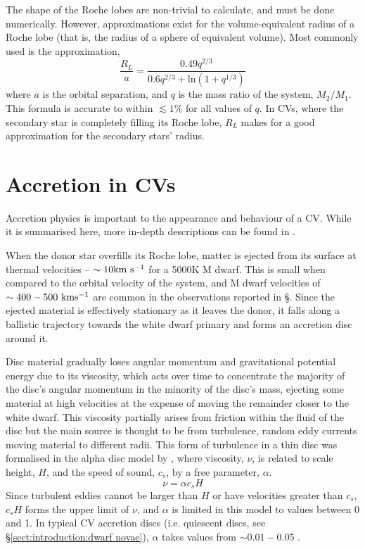 The shape of the Roche lobes are non-trivial to calculate, and must be done numerically. However, approximations exist for the volume-equivalent radius of a Roche lobe (that is, the radius of a sphere of equivalent volume). Most commonly used is the \citet{Eggleton1983} approximation,
\begin{equation}
    \label{eqn:eggleton approximation}
    \frac{R_L}{a} = \frac{0.49 q^{2/3}}{0.6 q^{2/3} + \mathrm{ln}(1 + q^{1/3})}
\end{equation}
where $a$ is the orbital separation, and $q$ is the mass ratio of the system, $M_2 / M_1$. This formula is accurate to within $\lesssim 1\%$ for all values of $q$. In CVs, where the secondary star is completely filling its Roche lobe, $R_L$ makes for a good approximation for the secondary stars' radius.


\section{Accretion in CVs}
\label{sect:introduction:accretion}
Accretion physics is important to the appearance and behaviour of a CV. While it is summarised here, more in-depth descriptions can be found in \citet{warner1995, hellier2001, ritter2010}.

When the donor star overfills its Roche lobe, matter is ejected from its surface at thermal velocities -- $\sim 10 \rm km\ s^{-1}$ for a 5000K M dwarf. This is small when compared to the orbital velocity of the system, and M dwarf velocities of $\sim 400-500 \rm\ km s^{-1}$ are common in the observations reported in \S{}. Since the ejected material is effectively stationary as it leaves the donor, it falls along a ballistic trajectory towards the white dwarf primary and forms an accretion disc around it. 

Disc material gradually loses angular momentum and gravitational potential energy due to its viscosity, which acts over time to concentrate the majority of the disc's angular momentum in the minority of the disc's mass, ejecting some material at high velocities at the expense of moving the remainder closer to the white dwarf. This viscosity partially arises from friction within the fluid of the disc but the main source is thought to be from turbulence, random eddy currents moving material to different radii. This form of turbulence in a thin disc was formalised in the alpha disc model by \citet{shakura1973}, where viscosity, $\nu$, is related to scale height, $H$, and the speed of sound, $c_s$, by a free parameter, $\alpha$.
\begin{equation}
    \label{eqn:disc viscocity}
    \nu = \alpha c_s H
\end{equation}
Since turbulent eddies cannot be larger than $H$ or have velocities greater than $c_s$, $c_s H$ forms the upper limit of $\nu$, and $\alpha$ is limited in this model to values between 0 and 1. In typical CV accretion discs (i.e. quiescent discs, see \S\ref{sect:introduction:dwarf novae}), $\alpha$ takes values from $\sim 0.01 - 0.05$ \citet{hellier2001}.


